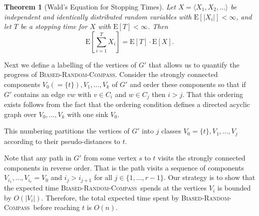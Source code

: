 \documentclass [letterpaper] {article}
\newcommand{\brc}{\textsc{Biased-Random-Compass}}
\newtheorem{theorem}{Theorem}%
\begin{document}
\begin{theorem}[Wald's Equation for Stopping Times]
\label{thm:wald}
Let $X=\langle X_{1},X_{2},\ldots\rangle$ be independent and identically distributed random variables with $\mathrm{E}[|X_{i}|] < \infty$, and let $T$ be a stopping time for $X$ with $\mathrm{E}[T] < \infty$. Then
\[ \mathrm{E}\left[ \sum_{i=1}^{T}X_{i} \right] = \mathrm{E}[T]\cdot\mathrm{E}[X]. \]
\end{theorem}

Next we define a labelling of the vertices of $G'$ that allows us to quantify the progress of \textsc{Biased-Random-Compass}.
Consider the strongly connected components $V_0(=\{t\}),V_1,\ldots,V_k$ of $G'$ and order these components so that if $G'$ contains an edge $vw$ with $v\in C_i$ and $w\in C_j$ then $i > j$.  That this ordering exists follows from the fact that the ordering condition defines a directed acyclic graph over $V_0,\ldots,V_k$ with one sink $V_0$. 


This numbering partitions the vertices of $G'$ into $j$ classes $V_{0} = \{t\}, V_{1}, \ldots, V_{j}$ according to their pseudo-distances to $t$. 

Note that any path in $G'$ from some vertex $s$ to $t$ visits the strongly connected components in reverse order.  That is the path visits a sequence of components $V_{i_1},\ldots,V_{i_r}=V_0$ and $i_j > i_{j+1}$ for all $j\in\{1,\ldots,r-1\}$.  Our strategy is to show that the expected time \brc\ spends at the vertices $V_{i}$ is bounded by $O(|V_{i}|)$. Therefore, the total expected time spent by \brc\ before reaching $t$ is $O(n)$.  
\end{document}
